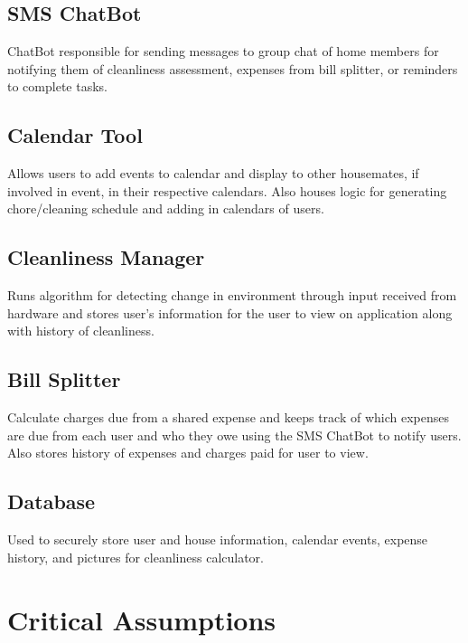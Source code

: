 \documentclass{article}
\begin{document}
\subsection{SMS ChatBot}
ChatBot responsible for sending messages to group chat of home members for notifying them of cleanliness assessment, expenses from bill splitter, or reminders to complete tasks.

\subsection{Calendar Tool}
Allows users to add events to calendar and display to other housemates, if involved in event, in their respective calendars. Also houses logic for generating chore/cleaning schedule and adding in calendars of users.

\subsection{Cleanliness Manager}
Runs algorithm for detecting change in environment through input received from hardware and stores user's information for the user to view on application along with history of cleanliness.

\subsection{Bill Splitter}
Calculate charges due from a shared expense and keeps track of which expenses are due from each user and who they owe using the SMS ChatBot to notify users. Also stores history of expenses and charges paid for user to view.

\subsection{Database}
Used to securely store user and house information, calendar events, expense history, and pictures for cleanliness calculator.


\section{Critical Assumptions}
\end{document}
